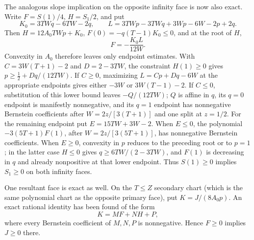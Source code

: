 \documentclass[11pt]{article}
\theoremstyle{remark}
\begin{document}
The analogous slope implication on the opposite infinity face is now also
exact.  Write \(F=S(1)/4\), \(H=S_1/2\), and put
\[
 K_0=3TWq-6TW-2q,\qquad
 L=3TWp-3TWq+3Wp-6W-2p+2q.
\]
Then \(H=12A_0TWp+K_0\), \(F(0)=-q(T-1)K_0\leq0\), and at the root of
\(H\),
\[
                         F=-\frac{K_0L}{12W}.
\]
Convexity in \(A_0\) therefore leaves only endpoint estimates.  With
\(C=3W(T+1)-2\) and \(D=2-3TW\), the constraint \(H(1)\geq0\) gives
\(p\geq\tfrac12+Dq/(12TW)\).  If \(C\geq0\), maximizing
\(L=Cp+Dq-6W\) at the appropriate endpoints gives either \(-3W\) or
\(3W(T-1)-2\).  If \(C\leq0\), substitution of this lower bound leaves
\(-Q/(12TW)\); \(Q\) is affine in \(q\), its \(q=0\) endpoint is
manifestly nonnegative, and its \(q=1\) endpoint has nonnegative Bernstein
coefficients after \(W=2z/[3(T+1)]\) and one split at \(z=1/2\).
For the remaining endpoint put \(E=15TW+3W-2\).  When \(E\leq0\), the
polynomial \(-3(5T+1)F(1)\), after
\(W=2z/[3(5T+1)]\), has nonnegative Bernstein coefficients.  When
\(E\geq0\), convexity in \(p\) reduces to the preceding root or to
\(p=1\); in the latter case \(H\leq0\) gives
\(q\geq6TW/(2-3TW)\), and \(F(1)\) is decreasing in \(q\) and already
nonpositive at that lower endpoint.  Thus \(S(1)\geq0\) implies
\(S_1\geq0\) on both infinity faces.

One resultant face is exact as well.  On the \(T\leq Z\) secondary chart
(which is the same polynomial chart as the opposite primary face), put
\(K=J/(8A_0p)\).  An exact rational identity has been found of the form
\[
                         K=M F+N H+P,
\]
where every Bernstein coefficient of \(M,N,P\) is nonnegative.  Hence
\(F\geq0\) implies \(J\geq0\) there.
\end{document}
